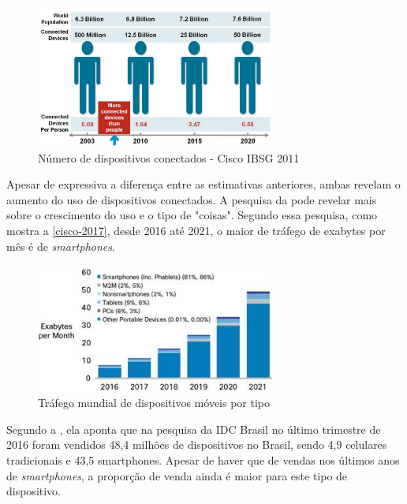 \begin{figure}[htb]
  \caption{\label{cisco2011}Número de dispositivos conectados - Cisco IBSG 2011}
  \begin{center}
    \includegraphics[width=0.70\textwidth]{img/cisco-2011.png}
  \end{center}
\end{figure}

Apesar de expressiva a diferença entre as estimativas anteriores, ambas revelam o aumento do uso de dispositivos conectados.
A pesquisa da  pode revelar mais sobre o crescimento do uso e o tipo de "coisas". Segundo essa pesquisa,
como mostra a \autoref{cisco-2017}, desde
2016 até 2021, o maior de tráfego de exabytes por mês é de \emph{smartphones}.

\begin{figure}[htb]
  \caption{\label{cisco-2017}Tráfego mundial de dispositivos móveis por tipo}
  \begin{center}
    \includegraphics[width=0.70\textwidth]{img/cisco-2017.png}
  \end{center}
\end{figure}

Segundo a , ela aponta que na pesquisa da IDC Brasil
no último trimestre de 2016 foram vendidos 48,4 milhões de dispositivos no Brasil, sendo 4,9 celulares tradicionais e 43,5 smartphones. Apesar
de haver que de vendas nos últimos anos de \emph{smartphones}, a proporção de venda ainda é maior para este tipo de dispositivo.

